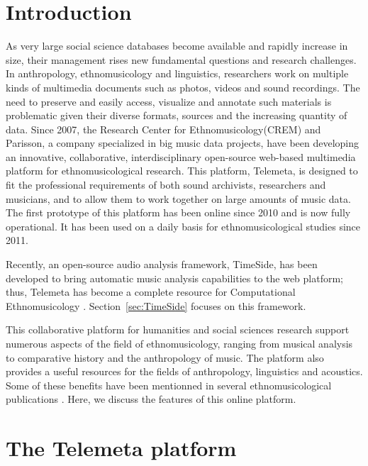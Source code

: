\documentclass{sig-alternate}
\newcommand{\CREM}{Research Center for Ethnomusicology}
\begin{document}
\section{Introduction}\label{sec:intro}
As very large social science databases become available and rapidly increase in size, their management rises new fundamental questions and research challenges. 
In anthropology, ethnomusicology and linguistics, researchers work on multiple kinds of multimedia documents such as photos, videos and sound recordings. The need to preserve and easily access, visualize and annotate such materials is problematic given their diverse formats, sources and the increasing quantity of data.
 Since 2007, the \CREM (CREM) and Parisson, a company specialized in big music data projects, have been developing an innovative, collaborative, interdisciplinary open-source web-based multimedia platform for ethnomusicological research. 
 This platform, Telemeta, is designed to fit the professional requirements of both sound archivists, researchers and musicians, and to allow them to work together on large amounts of music data. The first prototype of this platform has been online since 2010 and is now fully operational. It has been used on a daily basis for ethnomusicological studies since 2011. 

Recently, an open-source audio analysis framework, TimeSide, has been developed to bring automatic music analysis capabilities to the web platform; thus, Telemeta has become  a complete resource for Computational Ethnomusicology \cite{Tzanetakis_2007_JIMS, Gomez_JNMR_2013}. Section~\ref{sec:TimeSide} focuses on this framework.

This collaborative platform for humanities and social sciences research support numerous aspects of the field of ethnomusicology, ranging from musical analysis to comparative history and the anthropology of music. The platform also provides a useful resources for the fields of anthropology, linguistics and acoustics. Some of these benefits have been mentionned in several ethnomusicological publications \cite{Simmonot_IASA_2011, Julien_IASA_2011, Simonnot_ICTM_2014}.
Here, we discuss the features of this online platform.

 
 \section{The Telemeta platform}\label{sec:Telemeta}
\end{document}
